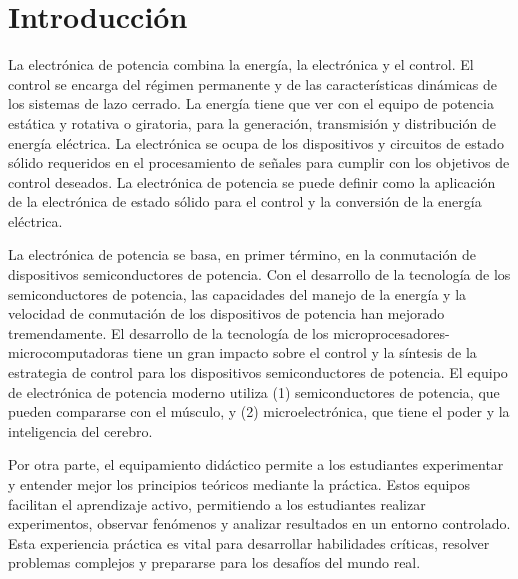 \section*{Introducción}
\justifying

La electrónica de potencia combina la energía, la electrónica y el control. El control se encarga
del régimen permanente y de las características dinámicas de los sistemas de lazo cerrado.
La energía tiene que ver con el equipo de potencia estática y rotativa o giratoria, para
la generación, transmisión y distribución de energía eléctrica. La electrónica se ocupa de los
dispositivos y circuitos de estado sólido requeridos en el procesamiento de señales para cumplir
con los objetivos de control deseados. La electrónica de potencia se puede definir como la
aplicación de la electrónica de estado sólido para el control y la conversión de la energía eléctrica.

La electrónica de potencia se basa, en primer término, en la conmutación de dispositivos
semiconductores de potencia. Con el desarrollo de la tecnología de los semiconductores de potencia,
las capacidades del manejo de la energía y la velocidad de conmutación de los dispositivos de potencia
han mejorado tremendamente. El desarrollo de la tecnología de los microprocesadores-microcomputadoras
tiene un gran impacto sobre el control y la síntesis de la estrategia de control para los dispositivos
semiconductores de potencia. El equipo de electrónica de potencia moderno utiliza (1) semiconductores
de potencia, que pueden compararse con el músculo, y (2) microelectrónica, que tiene el poder y
la inteligencia del cerebro. \parencite{RASHID}

Por otra parte, el equipamiento didáctico permite a los estudiantes experimentar y entender
mejor los principios teóricos mediante la práctica. Estos equipos facilitan el aprendizaje activo,
permitiendo a los estudiantes realizar experimentos, observar fenómenos y analizar resultados
en un entorno controlado. Esta experiencia práctica es vital para desarrollar habilidades críticas,
resolver problemas complejos y prepararse para los desafíos del mundo real.